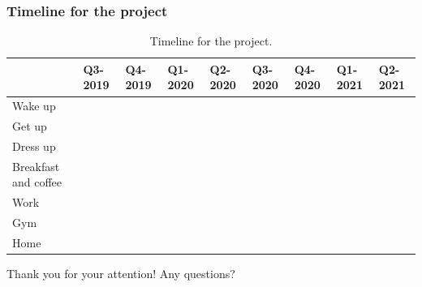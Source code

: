 \documentclass[notes, 10pt,xcolor=table]{beamer}
\begin{document}
\begin{frame}
  \frametitle{Timeline for the project}
\begin{table}[tp]
  \caption{Timeline for the project.}
  \label{table:timeline}
  \begin{adjustwidth}{-0.15in}{0.0in}
    \centering
    \footnotesize
    \begin{tabular}{|l|l|l|l|l|l|l|l|l|}
      \hline
      & \textbf{Q3-2019}                  & \textbf{Q4-2019}                 & \textbf{Q1-2020} & \textbf{Q2-2020} & \textbf{Q3-2020} & \textbf{Q4-2020}      & \textbf{Q1-2021}      & \textbf{Q2-2021}     \\ \hline
      Wake up           & \multicolumn{2}{l|}{\cellcolor[HTML]{34FF34}{\color[HTML]{000000} }} &                  &                  &                  &                       &                       &                      \\ \hline
      Get up           & \multicolumn{2}{l|}{\cellcolor[HTML]{38FFF8}{\color[HTML]{000000} }} &                  &                  &                  &                       &                       &                      \\ \hline
      Dress up &                                   & \multicolumn{2}{l|}{\cellcolor[HTML]{3531FF}}       &                  &                  &                       &                       &                      \\ \hline
      Breakfast and coffee          &                                   &                                  & \multicolumn{3}{l|}{\cellcolor[HTML]{6200C9}}          &                       &                       &                      \\ \hline
      Work        &                                   &                                  & \multicolumn{3}{l|}{\cellcolor[HTML]{F8A102}}          &                       &                       &                      \\ \hline
      Gym    &                                   &                                  &                  &                  & \multicolumn{3}{l|}{\cellcolor[HTML]{FD6864}}                    &                      \\ \hline
      Home                  &                                   &                                  &                  &                  &                  & \multicolumn{3}{l|}{\cellcolor[HTML]{CB0000}{\color[HTML]{000000} }} \\ \hline
    \end{tabular}    
  \end{adjustwidth}
\end{table}  
\end{frame}

\begin{frame}{\Large Thank you for your attention!}
  \centering \Large Any questions?
\end{frame}

\begin{frame}
    \printbibliography
\end{frame} 
 
\end{document}
